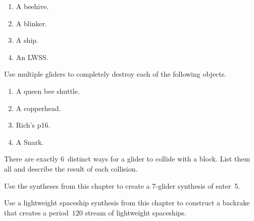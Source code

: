 \begin{multicols}{2}
\begin{problemstar}
\begin{enumerate}[label=\bf\color{ocre}(\alph*)]
			\item A beehive.
			
			\item A blinker.
			
			\item A ship.
			
			\item An LWSS.
		\end{enumerate}
	\end{problemstar}
	
	
	\mfilbreak
	
	
	\begin{problem}\label{exer:multiple_glider_cleanup} 
		Use multiple gliders to completely destroy each of the following objects.
		
		\begin{enumerate}[label=\bf\color{ocre}(\alph*)]
			\item A queen bee shuttle.
			
			\item A copperhead.
			
			\item Rich's p16.
			
			\item A Snark.
		\end{enumerate}
	\end{problem}
	
	
	\mfilbreak
	
	
	\begin{problemstar}\label{exer:glider_block_collisions} 
		There are exactly $6$~distinct ways for a glider to collide with a block. List them all and describe the result of each collision.
	\end{problemstar}
	
	
	\mfilbreak
	
	
	\begin{problemstar}\label{exer:twit_synthesis} 
		Use the syntheses from this chapter to create a 7-glider synthesis of eater~5.
	\end{problemstar}
	
	
	\mfilbreak
	
	
	\begin{problem}\label{exer:p60_lwss_backrake} 
		Use a lightweight spaceship synthesis from this chapter to construct a backrake that creates a period~$120$ stream of lightweight spaceships.
	\end{problem}
	

\end{multicols}
